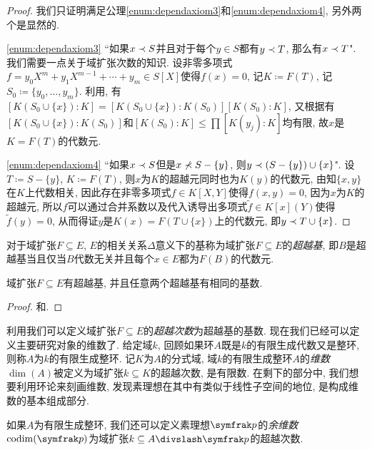 \begin{proof}
  我们只证明满足公理\ref{enum:dependaxiom3}和\ref{enum:dependaxiom4}, 另外两个是显然的.

  \ref{enum:dependaxiom3} ``如果$x\prec S$并且对于每个$y\in S$都有$y\prec T$, 那么有$x\prec T$". 我们需要一点关于域扩张次数的知识. 设非零多项式$f=y_0X^m+ y_1X^{m-1}+ \dotsb + y_m\in S[X]$使得$f(x)=0$, 记$K\coloneq F(T)$, 记$S_0\coloneq \{y_0, \dotsc, y_m\}$. 利用, 有$[K(S_0\cup\{x\}):K]=[K(S_0\cup\{x\}):K(S_0)][K(S_0):K]$, 又根据有$[K(S_0\cup\{x\}):K(S_0)]$和$[K(S_0):K]\leq\prod [K(y_j):K]$均有限, 故$x$是$K=F(T)$的代数元.

  \ref{enum:dependaxiom4} ``如果$x\prec S$但是$x\nprec S-\{y\}$, 则$y\prec (S-\{y\})\cup\{x\}$". 设$T\coloneq S-\{y\}$, $K\coloneq F(T)$, 则$x$为$K$的超越元同时也为$K(y)$的代数元, 由知$\{x, y\}$在$K$上代数相关, 因此存在非零多项式$f\in K[X, Y]$使得$f(x, y)=0$, 因为$x$为$K$的超越元, 所以$f$可以通过合并系数以及代入诱导出多项式$\tilde{f}\in K[x](Y)$使得$\tilde{f}(y)=0$, 从而得证$y$是$K(x)=F(T\cup\{x\})$上的代数元, 即$y\prec T\cup \{x\}$.
\end{proof}

\begin{definition}
  对于域扩张$F\subseteq E$, $E$的相关关系$\Delta$意义下的基称为域扩张$F\subseteq E$的\emph{超越基}, 即$B$是超越基当且仅当$B$代数无关并且每个$x\in E$都为$F(B)$的代数元.
\end{definition}

\begin{theorem}\label{thm:tranbasis}
  域扩张$F\subseteq E$有超越基, 并且任意两个超越基有相同的基数.
\end{theorem}

\begin{proof}
  和.
\end{proof}

利用我们可以定义域扩张$F\subseteq E$的\emph{超越次数}为超越基的基数. 现在我们已经可以定义主要研究对象的维数了. 给定域$k$, 回顾如果环$A$既是$k$的有限生成代数又是整环, 则称$A$为$k$的有限生成整环. 记$K$为$A$的分式域, 域$k$的有限生成整环$A$的\emph{维数} $\dim (A)$被定义为域扩张$k\subseteq K$的超越次数, 是有限数. 在剩下的部分中, 我们想要利用环论来刻画维数, 发现素理想在其中有类似于线性子空间的地位, 是构成维数的基本组成部分.

如果$A$为有限生成整环, 我们还可以定义素理想$\ideal{p}$的\emph{余维数} $\codim (\ideal{p})$为域扩张$k\subseteq A{\divslash}\ideal{p}$的超越次数.

